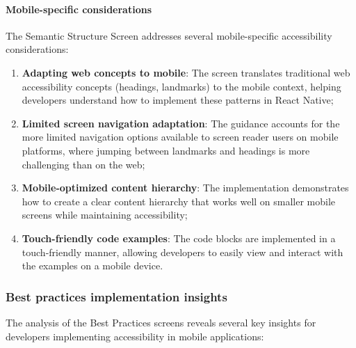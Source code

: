 \paragraph{Mobile-specific considerations}

The Semantic Structure Screen addresses several mobile-specific accessibility considerations:

\begin{enumerate}
    \item \textbf{Adapting web concepts to mobile}: The screen translates traditional web accessibility concepts (headings, landmarks) to the mobile context, helping developers understand how to implement these patterns in React Native;
    
    \item \textbf{Limited screen navigation adaptation}: The guidance accounts for the more limited navigation options available to screen reader users on mobile platforms, where jumping between landmarks and headings is more challenging than on the web;
    
    \item \textbf{Mobile-optimized content hierarchy}: The implementation demonstrates how to create a clear content hierarchy that works well on smaller mobile screens while maintaining accessibility;
    
    \item \textbf{Touch-friendly code examples}: The code blocks are implemented in a touch-friendly manner, allowing developers to easily view and interact with the examples on a mobile device.
\end{enumerate}

\subsubsection{Best practices implementation insights}
\label{subsubsec:best-practices-insights}

The analysis of the Best Practices screens reveals several key insights for developers implementing accessibility in mobile applications:

